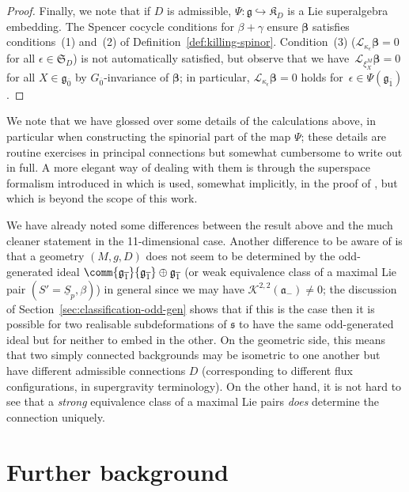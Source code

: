 \documentclass[10pt,a4paper]{amsart}
\numberwithin{equation}{section}
\newcommand{\fa}{\mathfrak{a}}
\newcommand{\fg}{\mathfrak{g}}
\newcommand{\fs}{\mathfrak{s}}
\newcommand{\fK}{\mathfrak{K}}
\newcommand{\fS}{\mathfrak{S}}
\newcommand{\eL}{\mathscr{L}}
\newcommand{\cK}{\mathcal{K}}
\newcommand{\Sbundle}{\underline{S}}
\newcommand{\1}{\mathbbm{1}}
\begin{document}
\begin{proof}
	Finally, we note that if $D$ is admissible, $\Psi\colon\fg\hookrightarrow\fK_D$ is a Lie superalgebra embedding. The Spencer cocycle conditions for $\beta+\gamma$ ensure $\boldsymbol{\beta}$ satisfies conditions~(1) and~(2) of Definition~\ref{def:killing-spinor}. Condition~(3) ($\eL_{\kappa_\epsilon}\boldsymbol{\beta}=0$ for all $\epsilon\in\fS_D$) is not automatically satisfied, but observe that we have~$\eL_{\xi^M_X}\boldsymbol{\beta}=0$ for all $X\in\fg_{\overline 0}$ by $G_{\overline 0}$-invariance of $\boldsymbol{\beta}$; in particular, $\eL_{\kappa_\epsilon}\boldsymbol{\beta}=0$ holds for~${\epsilon\in\Psi(\fg_{\overline 1})}$.
\end{proof}

We note that we have glossed over some details of the calculations above, in particular when constructing the spinorial part of the map $\Psi$; these details are routine exercises in principal connections but somewhat cumbersome to write out in full. A more elegant way of dealing with them is through the superspace formalism introduced in \cite{Santi2010} which is used, somewhat implicitly, in the proof of \cite[Theorem~13]{Figueroa-OFarrill2017_1}, but which is beyond the scope of this work.

\begin{Remark}
We have already noted some differences between the result above and the much cleaner statement in the 11-dimensional case. Another difference to be aware of is that a geometry $(M,g,D)$ does not seem to be determined by the odd-generated ideal $\comm{\fg_{\overline 1}}{\fg_{\overline 1}}\oplus\fg_{\overline 1}$ (or weak equivalence class of a maximal Lie pair $(S'=\Sbundle_p,\beta)$) in general since we may have $\cK^{2,2}(\fa_-)\neq 0$; the discussion of Section~\ref{sec:classification-odd-gen} shows that if this is the case then it is possible for two realisable subdeformations of $\fs$ to have the same odd-generated ideal but for neither to embed in the other. On the geometric side, this means that two simply connected backgrounds may be isometric to one another but have different admissible connections $D$ (corresponding to different flux configurations, in supergravity terminology). On the other hand, it is not hard to see that a \emph{strong} equivalence class of a maximal Lie pairs \emph{does} determine the connection uniquely.
\end{Remark}

\appendix

\section{Further background}
\label{app:further-background}
\end{document}
